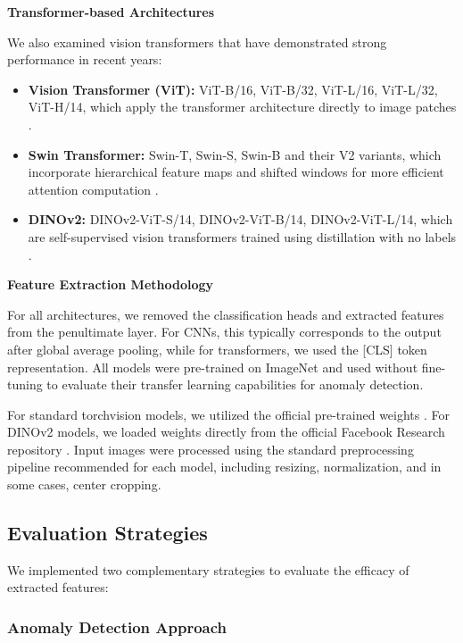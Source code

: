 \documentclass[12pt,a4paper,oneside]{report}
\begin{document}
\textbf{Transformer-based Architectures}

We also examined vision transformers that have demonstrated strong performance in recent years:

\begin{itemize}
    \item \textbf{Vision Transformer (ViT):} ViT-B/16, ViT-B/32, ViT-L/16, ViT-L/32, ViT-H/14, which apply the transformer architecture directly to image patches \cite{dosovitskiyImageWorth16x162021}.
    
    \item \textbf{Swin Transformer:} Swin-T, Swin-S, Swin-B and their V2 variants, which incorporate hierarchical feature maps and shifted windows for more efficient attention computation \cite{liuSwinTransformerHierarchical2021}.
    
    \item \textbf{DINOv2:} DINOv2-ViT-S/14, DINOv2-ViT-B/14, DINOv2-ViT-L/14, which are self-supervised vision transformers trained using distillation with no labels \cite{oquabDINOv2LearningRobust2024}.
\end{itemize}

\textbf{Feature Extraction Methodology}

For all architectures, we removed the classification heads and extracted features from the penultimate layer. For CNNs, this typically corresponds to the output after global average pooling, while for transformers, we used the [CLS] token representation. All models were pre-trained on ImageNet and used without fine-tuning to evaluate their transfer learning capabilities for anomaly detection.

For standard torchvision models, we utilized the official pre-trained weights \cite{ModelsPretrainedWeights}. For DINOv2 models, we loaded weights directly from the official Facebook Research repository \cite{FacebookresearchDinov22025}. Input images were processed using the standard preprocessing pipeline recommended for each model, including resizing, normalization, and in some cases, center cropping.

\subsection{Evaluation Strategies}

We implemented two complementary strategies to evaluate the efficacy of extracted features:

\subsubsection{Anomaly Detection Approach}
\end{document}
